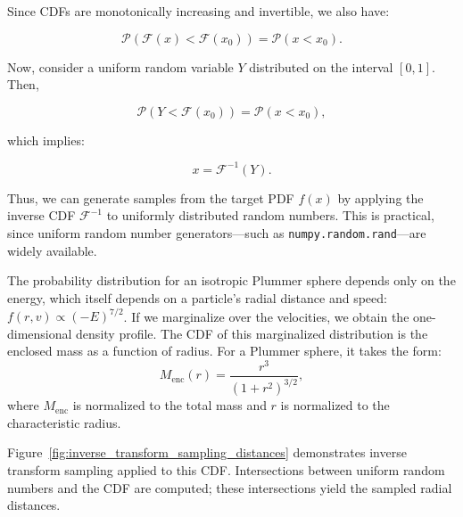             Since CDFs are monotonically increasing and invertible, we also have:

            \begin{equation}
                \mathcal{P}(\mathcal{F}(x) < \mathcal{F}(x_0)) = \mathcal{P}(x < x_0).
            \end{equation}

            Now, consider a uniform random variable $Y$ distributed on the interval $[0,1]$. Then,

            \begin{equation}
                \mathcal{P}(Y < \mathcal{F}(x_0)) = \mathcal{P}(x < x_0),
            \end{equation}

            which implies:

            \begin{equation}
                x = \mathcal{F}^{-1}(Y).
            \end{equation}

            Thus, we can generate samples from the target PDF $f(x)$ by applying the inverse CDF $\mathcal{F}^{-1}$ to uniformly distributed random numbers. This is practical, since uniform random number generators—such as \texttt{numpy.random.rand}—are widely available.

            The probability distribution for an isotropic Plummer sphere depends only on the energy, which itself depends on a particle's radial distance and speed: $f(r,v) \propto (-E)^{7/2}$. If we marginalize over the velocities, we obtain the one-dimensional density profile. The CDF of this marginalized distribution is the enclosed mass as a function of radius. For a Plummer sphere, it takes the form:
            \begin{equation}
                M_{\mathrm{enc}}(r) = \frac{r^3}{\left(1 + r^2\right)^{3/2}},
            \end{equation}
            where $M_{\mathrm{enc}}$ is normalized to the total mass and $r$ is normalized to the characteristic radius.

            Figure~\ref{fig:inverse_transform_sampling_distances} demonstrates inverse transform sampling applied to this CDF. Intersections between uniform random numbers and the CDF are computed; these intersections yield the sampled radial distances.

